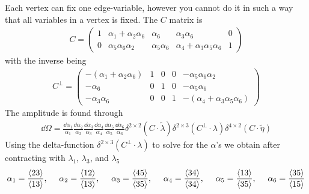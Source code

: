 \documentclass[letter,11pt]{article}
\begin{document}
Each vertex can fix one edge-variable, however you cannot do it in such a way that all variables in a vertex is fixed.
The $C$ matrix is
\begin{equation}
	\begin{aligned}
		C=\begin{pmatrix}
			1 & \alpha_1+\alpha_2\alpha_6 & \alpha_6 & \alpha_3\alpha_6 & 0\\
			0 & \alpha_5 \alpha_6 \alpha_2 & \alpha_5 \alpha_6 & \alpha_4+\alpha_3\alpha_5\alpha_6 & 1
		\end{pmatrix}
	\end{aligned}
\end{equation}
with the inverse being
\begin{equation}
	\begin{aligned}
		C^\perp =\begin{pmatrix}
			-(\alpha_1+\alpha_2\alpha_6) & 1 & 0 & 0 & -\alpha_5 \alpha_6 \alpha_2\\
			-\alpha_6 & 0 & 1 & 0 & -\alpha_5 \alpha_6 \\
			-\alpha_3 \alpha_6 & 0 & 0 & 1 & -(\alpha_4+\alpha_3\alpha_5\alpha_6)
		\end{pmatrix}
	\end{aligned}
\end{equation}
The amplitude is found through
\begin{equation}
	\begin{aligned}
		\dd \Omega =\frac{\dd \alpha_1}{\alpha_1}\frac{\dd \alpha_2}{\alpha_2}\frac{\dd \alpha_3}{\alpha_3}\frac{\dd \alpha_4}{\alpha_4}\frac{\dd \alpha_5}{\alpha_5}\frac{\dd \alpha_6}{\alpha_6}\delta^{2\times 2}(C\cdot \tilde \lambda) \delta^{2\times 3}(C^\perp\cdot \lambda)\delta^{4\times 2}(C\cdot \tilde \eta)
	\end{aligned}
\end{equation}
Using the delta-function $\delta^{2\times 3}(C^\perp\cdot \lambda)$ to solve for the $\alpha$'s we obtain after contracting with $\lambda_1$, $\lambda_3$, and $\lambda_5$
\begin{equation}
	\begin{aligned}
		\alpha_1=\frac{\expval{23}}{\expval{13}},~~~~
		\alpha_2=\frac{\expval{12}}{\expval{13}},~~~~
		\alpha_3=\frac{\expval{45}}{\expval{35}},~~~~
		\alpha_4=\frac{\expval{34}}{\expval{34}},~~~~
		\alpha_5=\frac{\expval{13}}{\expval{35}},~~~~
		\alpha_6=\frac{\expval{35}}{\expval{15}}
	\end{aligned}
\end{equation}
\end{document}
